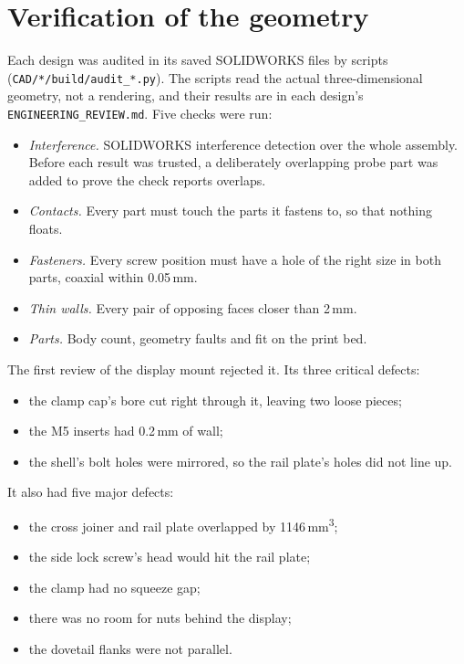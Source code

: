 \section{Verification of the geometry}
\label{sec:mech-verification}

Each design was audited in its saved SOLIDWORKS files by scripts (\texttt{CAD/*/build/audit\_*.py}). The scripts read the actual three-dimensional geometry, not a rendering, and their results are in each design's \texttt{ENGINEERING\_REVIEW.md}. Five checks were run:
\begin{itemize}
\item \emph{Interference.} SOLIDWORKS interference detection over the whole assembly. Before each result was trusted, a deliberately overlapping probe part was added to prove the check reports overlaps.
\item \emph{Contacts.} Every part must touch the parts it fastens to, so that nothing floats.
\item \emph{Fasteners.} Every screw position must have a hole of the right size in both parts, coaxial within 0.05\,mm.
\item \emph{Thin walls.} Every pair of opposing faces closer than 2\,mm.
\item \emph{Parts.} Body count, geometry faults and fit on the print bed.
\end{itemize}

The first review of the display mount rejected it. Its three critical defects:
\begin{itemize}
\item the clamp cap's bore cut right through it, leaving two loose pieces;
\item the M5 inserts had 0.2\,mm of wall;
\item the shell's bolt holes were mirrored, so the rail plate's holes did not line up.
\end{itemize}

It also had five major defects:
\begin{itemize}
\item the cross joiner and rail plate overlapped by 1146\,mm\textsuperscript{3};
\item the side lock screw's head would hit the rail plate;
\item the clamp had no squeeze gap;
\item there was no room for nuts behind the display;
\item the dovetail flanks were not parallel.
\end{itemize}

